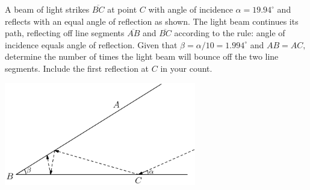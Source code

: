 A beam of light strikes $\overline{BC}$ at point $C$ with angle of incidence $\alpha=19.94^\circ$ and reflects with an equal angle of reflection as shown.  The light beam continues its path, reflecting off line segments $\overline{AB}$ and $\overline{BC}$ according to the rule: angle of incidence equals angle of reflection.  Given that $\beta=\alpha/10=1.994^\circ$ and $AB=AC,$ determine the number of times the light beam will bounce off the two line segments.  Include the first reflection at $C$ in your count.

\begin{center}
\includegraphics[width = 83.60000000000001mm]{img/fig0.png}
\end{center}